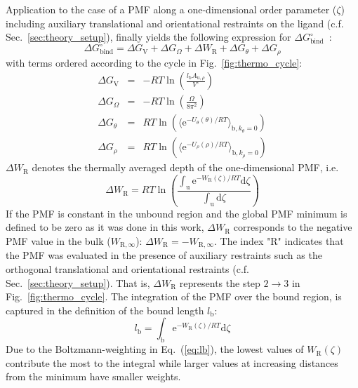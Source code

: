 \documentclass[9pt,lessons,pubversion]{livecoms}
\begin{document}
Application to the case of a PMF along a one-dimensional order parameter ($\zeta$) including auxiliary translational and orientational restraints on the ligand (c.f. Sec.~\ref{sec:theory_setup}), 
finally yields the following expression for $\Delta G^\circ_\mathrm{bind}$~\cite{markthaler2017molecular, doudou2009standard}: 
\begin{equation}
\Delta G^\circ_\mathrm{bind} = \Delta G_\mathrm{V} + \Delta G_\Omega + \Delta W_\mathrm{R} + \Delta G_\theta + \Delta G_\rho
\label{eq:DG0_2}
\end{equation}
%
with terms ordered according to the cycle in Fig.~\ref{fig:thermo_cycle}:
\begin{eqnarray*}
\Delta G_\mathrm{V} & = &  - RT \ln\left(\frac{l_\mathrm{b} A_{\mathrm{u},\rho}}{V^\circ}\right) \\
\Delta G_\Omega & = & - RT \ln\left(\frac{\Omega}{8 \pi^2}\right) \\
\Delta G_\theta & = & RT \ln\left(\langle  \mathrm{e}^{- U_\theta(\theta)/RT}  \rangle_{\mathrm{b}, k_\theta=0}\right) \\
\Delta G_\rho & = & RT \ln\left(\langle  \mathrm{e}^{- U_\rho(\rho)/RT}  \rangle_{\mathrm{b}, k_\rho=0}\right)
\end{eqnarray*}
%
$\Delta W_\mathrm{R}$  denotes the thermally averaged depth of the one-dimensional PMF, i.e.
\begin{equation}
\Delta W_\mathrm{R} = RT \ln \left(\frac{ \int_\mathrm{u}{ \mathrm{e}^{- W_\mathrm{R}(\zeta)/RT} \mathrm{d} \zeta } }{ \int_\mathrm{u}{  \mathrm{d} \zeta } } \right)
\end{equation}
If the PMF is constant in the unbound region and the global PMF minimum is defined to be zero as it was done in this work, $\Delta W_\mathrm{R}$ corresponds to the negative PMF value in the bulk 
($W_{\mathrm{R},\infty}$): $\Delta W_\mathrm{R} = - W_{\mathrm{R},\infty}$.
%
The index "R" indicates that the PMF was evaluated in the presence of auxiliary restraints such as the orthogonal translational and orientational restraints (c.f. Sec.~\ref{sec:theory_setup}).
That is, $\Delta W_\mathrm{R}$ represents the step $2 \rightarrow 3$ in Fig.~\ref{fig:thermo_cycle}.
The integration of the PMF over the bound region, is captured in the definition of the bound length $l_\mathrm{b}$:
\begin{equation}
	l_\mathrm{b} = \int_\mathrm{b}{ \mathrm{e}^{- W_\mathrm{R}(\zeta)/RT} \mathrm{d} \zeta }
\label{eq:lb}
\end{equation}
Due to the Boltzmann-weighting in Eq.~(\ref{eq:lb}), the lowest values of $W_\mathrm{R}(\zeta)$ contribute the most to the integral while larger values at increasing distances from the minimum have smaller weights.
\end{document}
